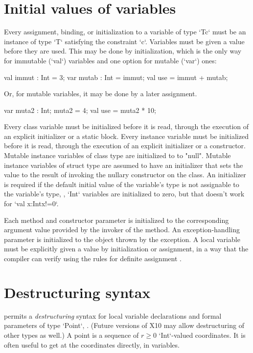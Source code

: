 \section{Initial values of variables}
\label{NullaryConstructor}

Every assignment, binding, or initialization to a variable of type \xcd`T{c}`
must be an instance of type \xcd`T` satisfying the constraint \xcd`{c}`.
Variables must be given a value before they are used. This may be done by
initialization, which is the only way for immutable (\xcd`val`) variables and
one option for mutable (\xcd`var`) ones: 

\begin{xten}
  val immut : Int = 3;
  var mutab : Int = immut;
  val use = immut + mutab;
\end{xten}
Or, for mutable variables, it may be done by a later assignment.  

\begin{xten}
  var muta2 : Int;
  muta2 = 4;
  val use = muta2 * 10;
\end{xten}


Every class variable must be initialized before it is read, through
the execution of an explicit initializer or a static block. Every
instance variable must be initialized before it is read, through the
execution of an explicit initializer or a constructor.
Mutable instance variables of class type are initialized to 
to \xcd"null".
Mutable instance variables of struct type are 
assumed to have an initializer that sets the value to the
result of invoking the nullary constructor on the class. 
An initializer is required if the default initial value of the variable's type
is not
assignable to the variable's type, \eg, \xcd`Int` variables are initialized to
zero, but that doesn't work for \xcd`val x:Int{x!=0}`.

Each method and constructor parameter is initialized to the
corresponding argument value provided by the invoker of the method. An
exception-handling parameter is initialized to the object thrown by
the exception. A local variable must be explicitly given a value by
initialization or assignment, in a way that the compiler can verify
using the rules for definite assignment \cite[\S~16]{jls2}.


\section{Destructuring syntax}
\Xten{} permits a \emph{destructuring} syntax for local variable
declarations and formal parameters of type \xcd`Point`, .
(Future versions of X10 may allow destructuring of other types as well.) 
A point is a sequence of {$r \ge 0$} \xcd`Int`-valued coordinates.  
It is often useful to get at the coordinates directly, in variables. 

